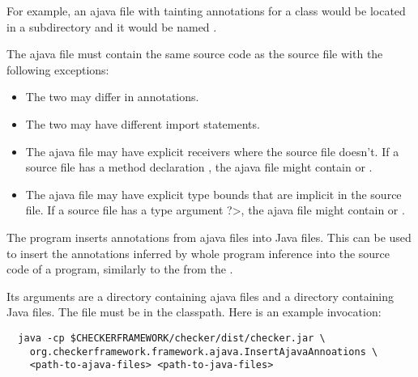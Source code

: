 For example, an ajava file with
tainting annotations for a class  would
be located in a subdirectory  and it would be
named
.



The
ajava file must contain the same source code as the source file with the following exceptions:
\begin{itemize}
  \item The two may differ in annotations.
  \item The two may have different import statements.
  \item The ajava file may have explicit receivers where the source file
    doesn't. If a source file has a method declaration , the ajava file might contain  or .
  \item The ajava file may have explicit type bounds that are implicit in the source file.
    If a source file has a type argument \<?>,
    the ajava file might contain  or .
\end{itemize}



The  program inserts annotations
from ajava files into Java files.  This can be used to
insert the annotations inferred by whole program inference into the source code
of a program, similarly to the
 from the
.

Its arguments are a directory containing ajava files and a directory
containing Java files.  The  file must be in the classpath.
Here is an example invocation:
\begin{Verbatim}
  java -cp $CHECKERFRAMEWORK/checker/dist/checker.jar \
    org.checkerframework.framework.ajava.InsertAjavaAnnoations \
    <path-to-ajava-files> <path-to-java-files>
\end{Verbatim}


